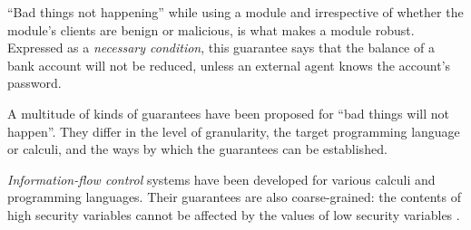   \vspace{.03in}
 ``Bad things not happening'' while using a module and irrespective of whether the module's
 clients are benign or malicious, is what makes a module  robust. 
Expressed as a \emph{necessary condition}, this guarantee says that the 
balance of a bank account will not be reduced, unless an external agent knows
the account's password.
%
 
 
A multitude of kinds of guarantees have been proposed for ``bad things  will
not happen''. They differ  in the level of granularity, 
the target programming language or calculi, and the ways by which 
the guarantees can be established.
 
 

\emph{Information-flow control}  systems have been developed for
various calculi and programming languages. Their 
 guarantees are also coarse-grained:  the contents of high security variables cannot
be affected by the values of low security variables 
\cite{Zdancewic:Myers:01,noninteferenceOS}. 
 

